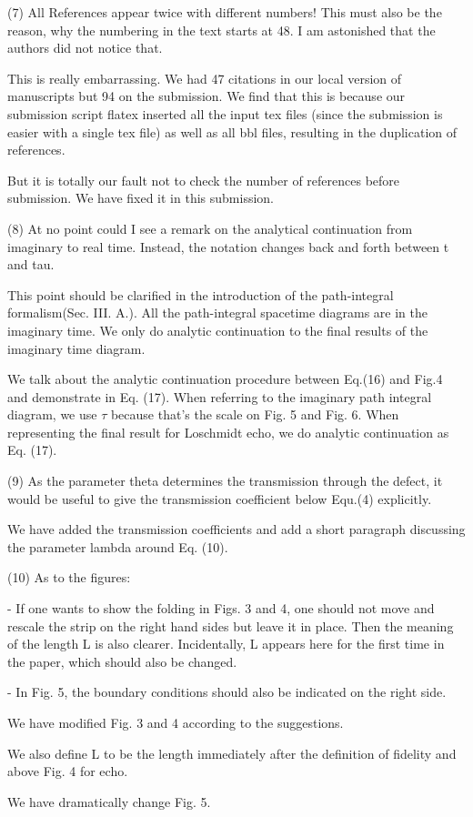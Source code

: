 \documentclass{article}
\newcommand{\reply}[1]{{\color{black}#1}}
\begin{document}
(7) All References appear twice with different numbers! This must also be the reason, why the numbering in the text starts at 48. I am astonished that the authors did not notice that.

\reply{This is really embarrassing. We had 47 citations in our local version of manuscripts but 94 on the submission. We find that this is because our submission script flatex inserted all the input tex files (since the submission is easier with a single tex file) as well as all bbl files, resulting in the duplication of references. 

But it is totally our fault not to check the number of references before submission. We have fixed it in this submission. }

(8) At no point could I see a remark on the analytical continuation from imaginary to real time. Instead, the notation changes back and forth between t and tau.

\reply{This point should be clarified in the introduction of the path-integral formalism(Sec. III. A.). All the path-integral spacetime diagrams are in the imaginary time. We only do analytic continuation to the final results of the imaginary time diagram.

We talk about the analytic continuation procedure between Eq.(16) and Fig.4 and demonstrate in Eq. (17). When referring to the imaginary path integral diagram, we use $\tau$ because that's the scale on Fig. 5 and Fig. 6. When representing the final result for Loschmidt echo, we do analytic continuation as Eq. (17). }

(9) As the parameter theta determines the transmission through the defect, it would be useful to give the transmission coefficient below Equ.(4) explicitly.

\reply{We have added the transmission coefficients and add a short paragraph discussing the parameter lambda around Eq. (10).}

(10) As to the figures:

- If one wants to show the folding in Figs. 3 and 4, one should not move and rescale the strip on the right hand sides but leave it in place. Then the meaning of the length L is also clearer. Incidentally, L appears here for the first time in the paper, which should also be changed.

- In Fig. 5, the boundary conditions should also be indicated on the right side.

\reply{We have modified Fig. 3 and 4 according to the suggestions. 

We also define L to be the length immediately after the definition of fidelity and above Fig. 4 for echo. 

We have dramatically change Fig. 5. 
}
\end{document}
